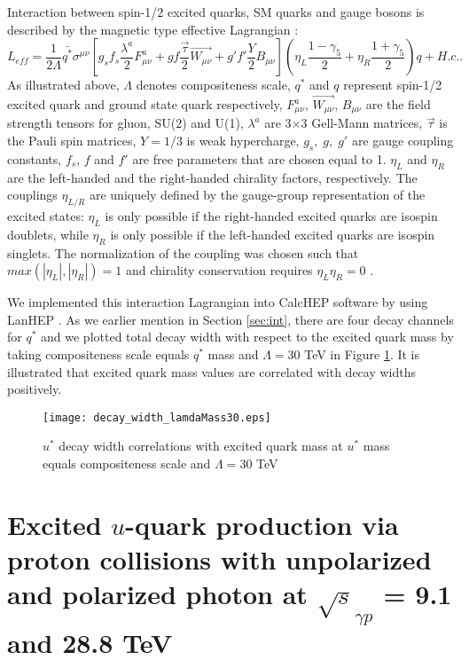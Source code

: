 \documentclass{appolb}
\begin{document}
Interaction between spin-1/2 excited quarks, SM quarks and gauge bosons is described by  the magnetic type effective Lagrangian \cite{kuhn1984,rujula1984,baur1987, pdg2016} : 
\begin{equation}
\label{eq:intLag}
{L_{eff} = \frac{1}{2\Lambda}\bar{q^*}\sigma^{\mu\nu}[g_s f_s \frac{\lambda^a}{2}F^a_{\mu \nu} + g f \frac{\vec{\tau}}{2}\vec{W_{\mu \nu}} + g'f' \frac{Y}{2}B_{\mu \nu}] (\eta_{L}\frac{1-\gamma_5}{2} + \eta_{R}\frac{1+\gamma_5}{2})q + H.c. }.
\end{equation}
As illustrated above, $\Lambda$  denotes compositeness scale, $q^*$ and $q$ represent  spin-1/2 excited quark and ground state quark   respectively, $F^a_{\mu \nu}$, $\vec{W_{\mu \nu}}$, $B_{\mu \nu}$ are the field strength tensors for gluon, SU(2) and U(1), $\lambda^a$ are 3$\times$3 Gell-Mann  matrices,  $\vec{\tau}$ is the Pauli spin matrices, $Y =1/3$  is weak hypercharge, $g_s,\;g,\;g'$ are gauge coupling constants, $f_s$, $f$ and $f'$ are  free parameters that are chosen equal to 1.  $\eta_{L}$  and  $\eta_{R}$  are the left-handed and  the right-handed chirality factors, respectively. The couplings $\eta_{L/R}$ are uniquely defined by the gauge-group representation of the excited states: $\eta_L$ is only possible if the right-handed excited quarks are isospin doublets, while $\eta_R$ is only possible if the left-handed excited quarks are isospin singlets. The normalization of the coupling  was chosen such that  $max(|\eta_{L}|, |\eta_{R}|) =1 $ and chirality conservation requires $\eta_{L}\eta_{R} = 0$ \cite{pdg2016}. 


We implemented this interaction Lagrangian into CalcHEP software \cite{calchep2013} by using LanHEP \cite{LanHEP,lanhep2016}.	As we earlier mention in Section \ref{sec:int}, there are four decay channels for $q^*$  and we plotted total decay width with respect to the excited quark mass by taking compositeness scale equals  $q^*$ mass  and $\Lambda = 30$ TeV in  Figure \ref{fig:decay}.  It is illustrated that excited quark mass values are correlated with decay widths positively.
\begin{figure} [h!]
	\centering
	\texttt{[image: decay\_width\_lamdaMass30.eps]}
	\caption{$u^*$ decay width correlations with excited quark mass  at $u^*$ mass equals  compositeness scale and $\Lambda = 30$ TeV}
	\label{fig:decay} 
\end{figure}

\section{\label{sec:IV}Excited $u$-quark production via proton collisions with unpolarized and polarized  photon at  $\sqrt{s}_{\gamma p}$ = 9.1 and 28.8 {TeV} }
\end{document}
